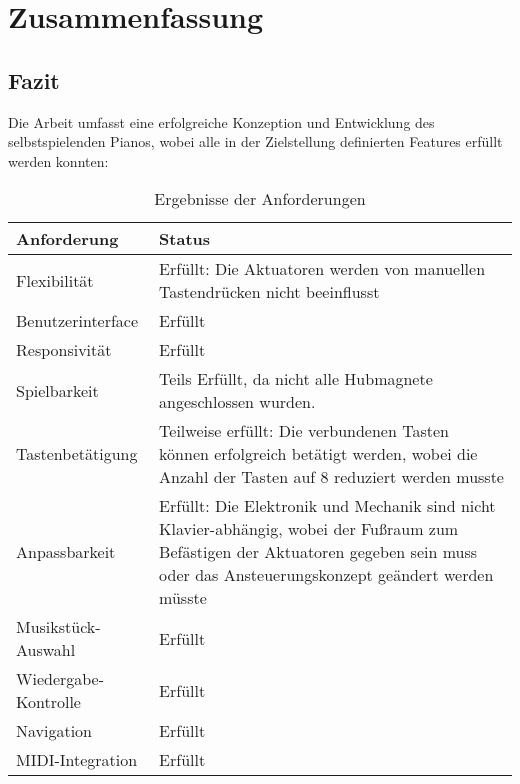 
\chapter{Zusammenfassung} \label{fazit}
\nocite{*}
\section{Fazit}
Die Arbeit umfasst eine erfolgreiche Konzeption und Entwicklung des selbstspielenden Pianos, wobei alle in der Zielstellung
definierten Features erfüllt werden konnten: \newline

\begin{table}[htbp]
    \centering
    \begin{tabular}{|m{4cm}|m{8cm}|}
        \hline
        \textbf{Anforderung} &  \textbf{Status}  \\
        \hline
        Flexibilität & Erfüllt: Die Aktuatoren werden von manuellen Tastendrücken nicht beeinflusst \\
        \hline
        Benutzerinterface & Erfüllt \\
        \hline
        Responsivität & Erfüllt \\
        \hline
        Spielbarkeit & Teils Erfüllt, da nicht alle Hubmagnete angeschlossen wurden. \\
        \hline
        Tastenbetätigung & Teilweise erfüllt: Die verbundenen Tasten können erfolgreich betätigt werden, wobei die Anzahl der Tasten auf
        8 reduziert werden musste \\
        \hline
        Anpassbarkeit & Erfüllt: Die Elektronik und Mechanik sind nicht Klavier-abhängig, wobei der Fußraum zum Befästigen der Aktuatoren
        gegeben sein muss oder das Ansteuerungskonzept geändert werden müsste\\
        \hline
        Musikstück-Auswahl & Erfüllt \\
        \hline
        Wiedergabe-Kontrolle & Erfüllt \\
        \hline
        Navigation & Erfüllt \\
        \hline
        MIDI-Integration & Erfüllt \\
        \hline
    \end{tabular}
    \caption{Ergebnisse der Anforderungen}
    \label{table:anorderungen-ergebnis}
\end{table}

